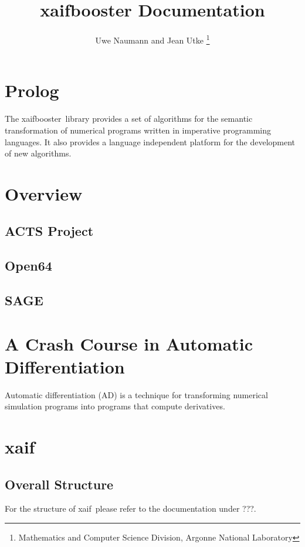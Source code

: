 \documentclass{book}
\title{xaifbooster Documentation}
\author{Uwe Naumann and Jean Utke \thanks{Mathematics and Computer Science Division, Argonne National Laboratory}}
\newcommand{\xaif}{xaif}
\newcommand{\xaifbooster}{xaifbooster}
\begin{document}
\maketitle

\tableofcontents

\chapter*{Prolog}

The \xaifbooster~library provides a set of
algorithms for the semantic transformation of
numerical programs written in imperative programming
languages. It also provides a language independent
platform for the development of new algorithms.


\chapter{Overview}

\section{ACTS Project}

\section{Open64}

\section{SAGE}

\chapter{A Crash Course in Automatic Differentiation}

Automatic differentiation (AD) \cite{CG91, BBCG96, CFG+01, Gri00} 
is a technique for transforming numerical
simulation programs into programs that compute derivatives.

\chapter{xaif}

\section{Overall Structure}

For the structure of \xaif\ please refer to the documentation 
under ???. 
\end{document}
